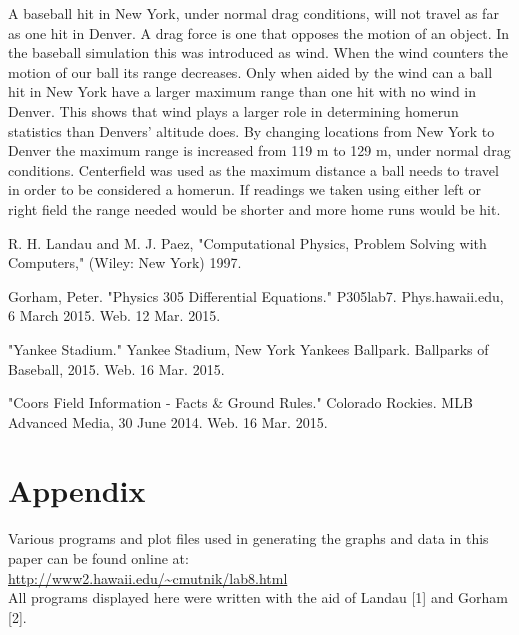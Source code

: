 \documentclass[11pt]{article}
\begin{document}
A baseball hit in New York, under normal drag conditions, will not travel as far as one hit in Denver.  A drag force is one that 
opposes the motion of an object.  In the baseball simulation this was introduced as wind.  When the wind counters the motion 
of our ball its range decreases.  Only when aided by the wind can a ball hit in New York have a larger maximum range than 
one hit with no 
wind in Denver.  This shows that wind plays a larger role in determining homerun statistics than Denvers' altitude does.  By 
changing locations from New York to Denver the maximum range is increased from 119 m to  129 m, under normal drag conditions.  
Centerfield was used as the maximum distance a ball needs to travel in order to be considered a homerun.  
If readings we taken using either left or right field the range needed would be shorter and more home runs would be hit.



\setlength{\parindent}{0cm}

\begin{thebibliography}{99}  %

 R. H. Landau and M. J. Paez, "Computational Physics, Problem Solving with Computers," (Wiley: New York) 1997.


 Gorham, Peter. "Physics 305 Differential Equations." P305lab7. Phys.hawaii.edu, 6 March 2015. Web. 12 Mar. 2015.


 "Yankee Stadium." Yankee Stadium, New York Yankees Ballpark. Ballparks of Baseball, 2015. Web. 16 Mar. 2015.


 "Coors Field Information - Facts & Ground Rules." Colorado Rockies. MLB Advanced Media, 30 June 2014. Web. 16 Mar. 2015.


\end{thebibliography}

\section*{Appendix}
Various programs and plot files used in generating the graphs and data in this paper can be found online at: \\
\url{http://www2.hawaii.edu/~cmutnik/lab8.html}\\
All programs displayed here were written with the aid of Landau [1] and Gorham [2].
\end{document}
